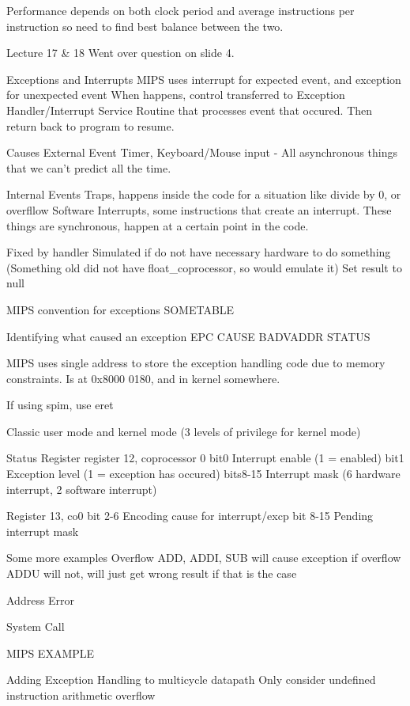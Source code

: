 \documentclass{article}
\begin{document}
	Performance depends on both clock period and average instructions per instruction so need to find best balance between the two.

Lecture 17 \& 18
	Went over question on slide 4.

	Exceptions and Interrupts
		MIPS uses interrupt for expected event, and exception for unexpected event
		When happens, control transferred to Exception Handler/Interrupt Service Routine that processes event that occured.
		Then return back to program to resume.

		Causes
			External Event
				Timer, Keyboard/Mouse input - All asynchronous things that we can't predict all the time.

			Internal Events
				Traps, happens inside the code for a situation like divide by 0, or overfllow
				Software Interrupts, some instructions that create an interrupt.
				These things are synchronous, happen at a certain point in the code.

				Fixed by handler
				Simulated if do not have necessary hardware to do something (Something old did not have float\_coprocessor, so would emulate it)
				Set result to null

	MIPS convention for exceptions
		SOMETABLE


	Identifying what caused an exception
		EPC
		CAUSE
		BADVADDR
		STATUS

		MIPS uses single address to store the exception handling code due to memory constraints.
		Is at 0x8000 0180, and in kernel somewhere.

		If using spim, use eret

		Classic user mode and kernel mode (3 levels of privilege for kernel mode)

	Status Register
		register 12, coprocessor 0
		bit0	Interrupt enable (1 = enabled)
		bit1	Exception level (1 = exception has occured)
		bits8-15	Interrupt mask (6 hardware interrupt, 2 software interrupt)

		Register 13, co0
		bit 2-6	Encoding cause for interrupt/excp
		bit 8-15	Pending interrupt mask

	Some more examples
		Overflow
			ADD, ADDI, SUB will cause exception if overflow
			ADDU will not, will just get wrong result if that is the case

		Address Error

		System Call

		MIPS EXAMPLE

	Adding Exception Handling to multicycle datapath
		Only consider
			undefined instruction
			arithmetic overflow
\end{document}
